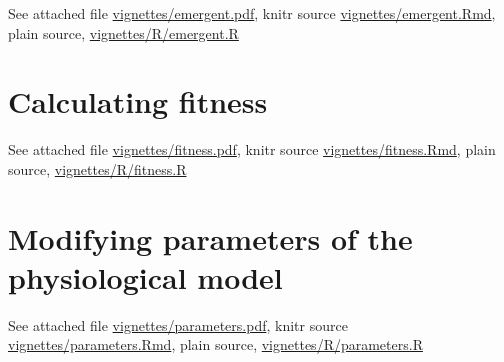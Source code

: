 \documentclass[a4paper,11pt]{article}
\begin{document}
\begin{appendices}
See attached file \url{vignettes/emergent.pdf}, knitr source
\url{vignettes/emergent.Rmd}, plain source, \url{vignettes/R/emergent.R}

\section{Calculating fitness}\label{sec:fitness}

See attached file \url{vignettes/fitness.pdf}, knitr source
\url{vignettes/fitness.Rmd}, plain source, \url{vignettes/R/fitness.R}

\section{Modifying parameters of the physiological model}\label{sec:parameters}

See attached file \url{vignettes/parameters.pdf}, knitr source
\url{vignettes/parameters.Rmd}, plain source, \url{vignettes/R/parameters.R}

\end{appendices}
\end{document}

